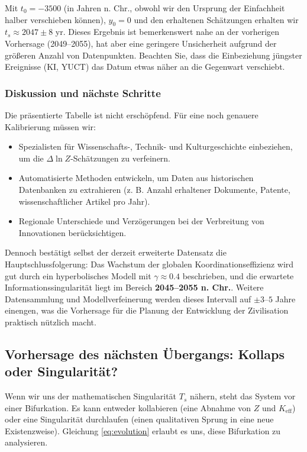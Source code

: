 \documentclass[12pt,a4paper]{article}
\theoremstyle{remark}
\begin{document}
	Mit $t_0 = -3500$ (in Jahren n. Chr., obwohl wir den Ursprung der Einfachheit halber verschieben können), $y_0 = 0$ und den erhaltenen Schätzungen erhalten wir $t_s \approx 2047 \pm 8$ yr. Dieses Ergebnis ist bemerkenswert nahe an der vorherigen Vorhersage (2049–2055), hat aber eine geringere Unsicherheit aufgrund der größeren Anzahl von Datenpunkten. Beachten Sie, dass die Einbeziehung jüngster Ereignisse (KI, YUCT) das Datum etwas näher an die Gegenwart verschiebt.
	
	\subsubsection{Diskussion und nächste Schritte}
	
	Die präsentierte Tabelle ist nicht erschöpfend. Für eine noch genauere Kalibrierung müssen wir:
	\begin{itemize}
		\item Spezialisten für Wissenschafts-, Technik- und Kulturgeschichte einbeziehen, um die $\Delta \ln Z$-Schätzungen zu verfeinern.
		\item Automatisierte Methoden entwickeln, um Daten aus historischen Datenbanken zu extrahieren (z. B. Anzahl erhaltener Dokumente, Patente, wissenschaftlicher Artikel pro Jahr).
		\item Regionale Unterschiede und Verzögerungen bei der Verbreitung von Innovationen berücksichtigen.
	\end{itemize}
	Dennoch bestätigt selbst der derzeit erweiterte Datensatz die Hauptschlussfolgerung: Das Wachstum der globalen Koordinationseffizienz wird gut durch ein hyperbolisches Modell mit $\gamma \approx 0.4$ beschrieben, und die erwartete Informationssingularität liegt im Bereich \textbf{2045–2055 n. Chr.}. Weitere Datensammlung und Modellverfeinerung werden dieses Intervall auf $\pm 3$–$5$ Jahre einengen, was die Vorhersage für die Planung der Entwicklung der Zivilisation praktisch nützlich macht.
	
	\subsection{Vorhersage des nächsten Übergangs: Kollaps oder Singularität?}
	
	Wenn wir uns der mathematischen Singularität $T_s$ nähern, steht das System vor einer Bifurkation. Es kann entweder kollabieren (eine Abnahme von $Z$ und $K_{\text{eff}}$) oder eine Singularität durchlaufen (einen qualitativen Sprung in eine neue Existenzweise). Gleichung \ref{eq:evolution} erlaubt es uns, diese Bifurkation zu analysieren.
	
\end{document}
